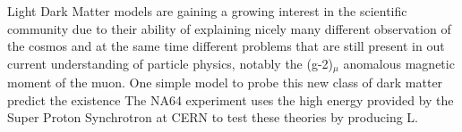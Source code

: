 Light Dark Matter models are gaining a growing interest in the scientific community due to their ability of explaining nicely many different observation of the cosmos and at the same time different problems that are still present in out current understanding of particle physics, notably the (g-2)$_{\mu}$ anomalous magnetic moment of the muon. One simple model to probe this new class of dark matter predict the existence The NA64 experiment uses the high energy provided by the Super Proton Synchrotron at CERN to test these theories by producing L.
